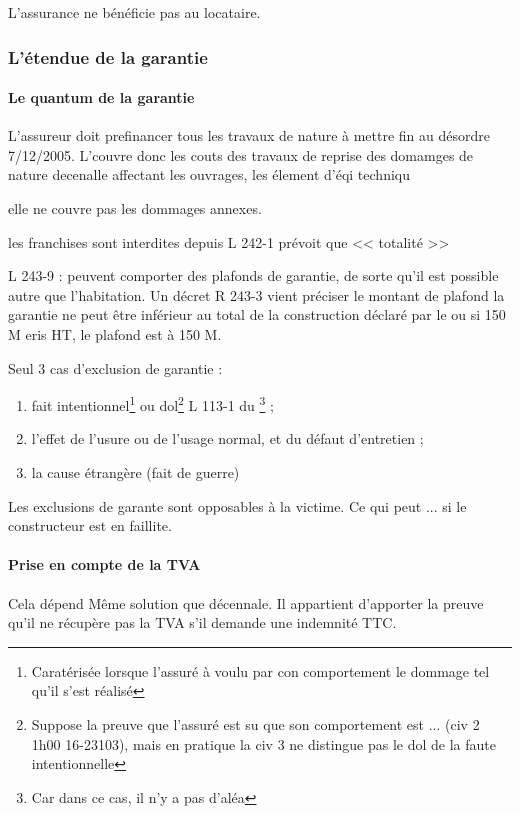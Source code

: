 			L'assurance \do ne bénéficie pas au locataire.

		\subsubsection{L'étendue de la garantie}



			\paragraph{Le quantum de la garantie}

				L'assureur doit prefinancer tous les travaux de nature à mettre fin au désordre 7/12/2005. L'\ado couvre donc les couts des travaux de reprise des domamges de nature decenalle affectant les ouvrages, les élement d'éqi techniqu

				elle ne couvre pas les dommages annexes.

				les franchises sont interdites depuis L 242-1 \ca prévoit que << totalité >>

				L 243-9 \ca : peuvent comporter des plafonds de garantie, de sorte qu'il est possible autre que l'habitation. Un décret R 243-3 \ca vient préciser le montant de plafond la garantie ne peut être inférieur au total de la construction déclaré par le \Mo ou si 150 M eris HT, le plafond est à 150 M.

				Seul 3 cas d'exclusion de garantie :
				\begin{enumerate}
					\item fait intentionnel\footnote{Caratérisée lorsque l'assuré à voulu par con comportement le dommage tel qu'il s'est réalisé} ou dol\footnote{Suppose la preuve que l'assuré est su que son comportement est ... (civ 2 1h00 16-23103), mais en pratique la civ 3 ne distingue pas le dol de la faute intentionnelle} L 113-1 du \ca\footnote{Car dans ce cas, il n'y a pas d'aléa} ;
					\item l'effet de l'usure ou de l'usage normal, et du défaut d'entretien ;
					\item la cause étrangère (fait de guerre\etc)
				\end{enumerate}
				Les exclusions de garante sont opposables à la victime. Ce qui peut ... si le constructeur est en faillite.

				\paragraph{Prise en compte de la TVA} Cela dépend  Même solution que décennale. Il appartient d'apporter la preuve qu'il ne récupère pas la TVA s'il demande une indemnité TTC.

